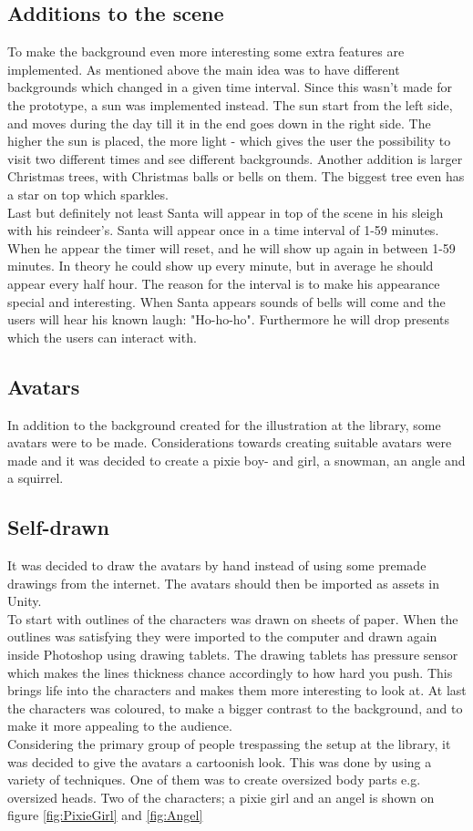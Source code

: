 \subsection{Additions to the scene}
To make the background even more interesting some extra features are implemented. As mentioned above the main idea was to have different backgrounds which changed in a given time interval. Since this wasn't made for the prototype, a sun was implemented instead. The sun start from the left side, and moves during the day till it in the end goes down in the right side. The higher the sun is placed, the more light - which gives the user the possibility to visit two different times and see different backgrounds. Another addition is larger Christmas trees, with Christmas balls or bells on them. The biggest tree even has a star on top which sparkles. \\
Last but definitely not least Santa will appear in top of the scene in his sleigh with his reindeer's. Santa will appear once in a time interval of 1-59 minutes. When he appear the timer will reset, and he will show up again in between 1-59 minutes. In theory he could show up every minute, but in average he should appear every half hour. The reason for the interval is to make his appearance special and interesting. When Santa appears sounds of bells will come and the users will hear his known laugh: "Ho-ho-ho". Furthermore he will drop presents which the users can interact with.

\subsection{Avatars}
In addition to the background created for the illustration at the library, some avatars were to be made. Considerations towards creating suitable avatars were made and it was decided to create a pixie boy- and girl, a snowman, an angle and a squirrel.
\subsection{Self-drawn}
It was decided to draw the avatars by hand instead of using some premade drawings from the internet. The avatars should then be imported as assets in Unity. \\
To start with outlines of the characters was drawn on sheets of paper. When the outlines was satisfying they were imported to the computer and drawn again inside Photoshop using drawing tablets. The drawing tablets has pressure sensor which makes the lines thickness chance accordingly to how hard you push. This brings life into the characters and makes them more interesting to look at. At last the characters was coloured, to make a bigger contrast to the background, and to make it more appealing to the audience.\\
Considering the primary group of people trespassing the setup at the library, it was decided to give the avatars a cartoonish look. This was done by using a variety of techniques. One of them was to create oversized body parts e.g. oversized heads. Two of the characters; a pixie girl and an angel is shown on figure \eqref{fig:PixieGirl} and \eqref{fig:Angel}

